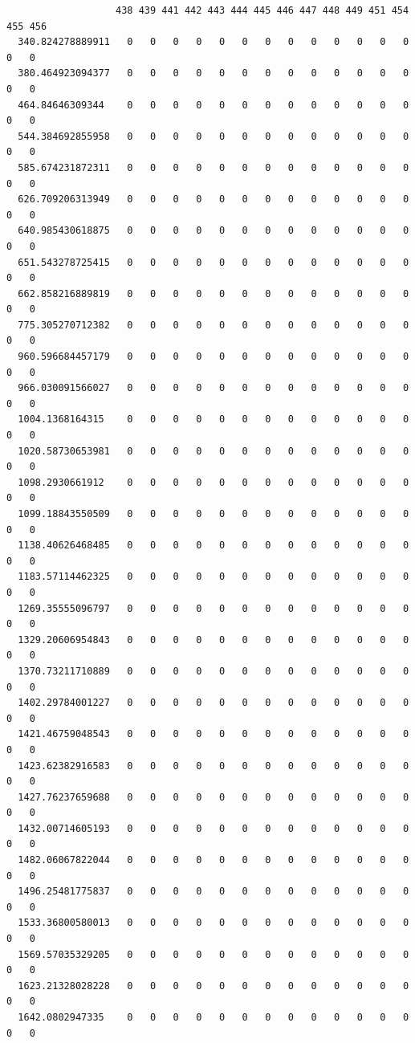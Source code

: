\documentclass[
  letterpaper,
  DIV=11,
  numbers=noendperiod]{scrartcl}
\begin{document}
\begin{verbatim}
                   438 439 441 442 443 444 445 446 447 448 449 451 454 455 456
  340.824278889911   0   0   0   0   0   0   0   0   0   0   0   0   0   0   0
  380.464923094377   0   0   0   0   0   0   0   0   0   0   0   0   0   0   0
  464.84646309344    0   0   0   0   0   0   0   0   0   0   0   0   0   0   0
  544.384692855958   0   0   0   0   0   0   0   0   0   0   0   0   0   0   0
  585.674231872311   0   0   0   0   0   0   0   0   0   0   0   0   0   0   0
  626.709206313949   0   0   0   0   0   0   0   0   0   0   0   0   0   0   0
  640.985430618875   0   0   0   0   0   0   0   0   0   0   0   0   0   0   0
  651.543278725415   0   0   0   0   0   0   0   0   0   0   0   0   0   0   0
  662.858216889819   0   0   0   0   0   0   0   0   0   0   0   0   0   0   0
  775.305270712382   0   0   0   0   0   0   0   0   0   0   0   0   0   0   0
  960.596684457179   0   0   0   0   0   0   0   0   0   0   0   0   0   0   0
  966.030091566027   0   0   0   0   0   0   0   0   0   0   0   0   0   0   0
  1004.1368164315    0   0   0   0   0   0   0   0   0   0   0   0   0   0   0
  1020.58730653981   0   0   0   0   0   0   0   0   0   0   0   0   0   0   0
  1098.2930661912    0   0   0   0   0   0   0   0   0   0   0   0   0   0   0
  1099.18843550509   0   0   0   0   0   0   0   0   0   0   0   0   0   0   0
  1138.40626468485   0   0   0   0   0   0   0   0   0   0   0   0   0   0   0
  1183.57114462325   0   0   0   0   0   0   0   0   0   0   0   0   0   0   0
  1269.35555096797   0   0   0   0   0   0   0   0   0   0   0   0   0   0   0
  1329.20606954843   0   0   0   0   0   0   0   0   0   0   0   0   0   0   0
  1370.73211710889   0   0   0   0   0   0   0   0   0   0   0   0   0   0   0
  1402.29784001227   0   0   0   0   0   0   0   0   0   0   0   0   0   0   0
  1421.46759048543   0   0   0   0   0   0   0   0   0   0   0   0   0   0   0
  1423.62382916583   0   0   0   0   0   0   0   0   0   0   0   0   0   0   0
  1427.76237659688   0   0   0   0   0   0   0   0   0   0   0   0   0   0   0
  1432.00714605193   0   0   0   0   0   0   0   0   0   0   0   0   0   0   0
  1482.06067822044   0   0   0   0   0   0   0   0   0   0   0   0   0   0   0
  1496.25481775837   0   0   0   0   0   0   0   0   0   0   0   0   0   0   0
  1533.36800580013   0   0   0   0   0   0   0   0   0   0   0   0   0   0   0
  1569.57035329205   0   0   0   0   0   0   0   0   0   0   0   0   0   0   0
  1623.21328028228   0   0   0   0   0   0   0   0   0   0   0   0   0   0   0
  1642.0802947335    0   0   0   0   0   0   0   0   0   0   0   0   0   0   0

\end{verbatim}
\end{document}
